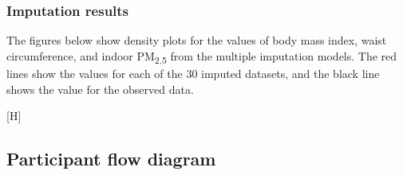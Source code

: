 \documentclass[
  letterpaper,
  DIV=11,
  numbers=noendperiod]{scrartcl}
\makeatletter
\renewenvironment{figure}%
   {\renewcommand\familydefault\sfdefault
    \@float{figure}}
   {\end@float}
\makeatother
\begin{document}
\subsubsection{Imputation results}\label{imputation-results}

The figures below show density plots for the values of body mass index,
waist circumference, and indoor PM\textsubscript{2.5} from the multiple
imputation models. The red lines show the values for each of the 30
imputed datasets, and the black line shows the value for the observed
data.

\begin{figure}[H]

\caption{\label{fig-afig-mi}Kernal density plots showing distribution of
multiply-imputed values for body mass index (kg/m\textsuperscript{2}),
waist circumference (cm), and indoor PM\textsubscript{2.5}
(µg/m\textsuperscript{3}) (red lines) and observed values (heavy black
line).}

\begin{minipage}{0.50\linewidth}


\subcaption{\label{fig-afig-mi-1}}

\end{minipage}%
%
\begin{minipage}{0.50\linewidth}


\subcaption{\label{fig-afig-mi-2}}

\end{minipage}%
\newline
\begin{minipage}{0.50\linewidth}


\subcaption{\label{fig-afig-mi-3}}

\end{minipage}%

\end{figure}%

\newpage

\subsection{Participant flow diagram}\label{participant-flow-diagram}
\end{document}
